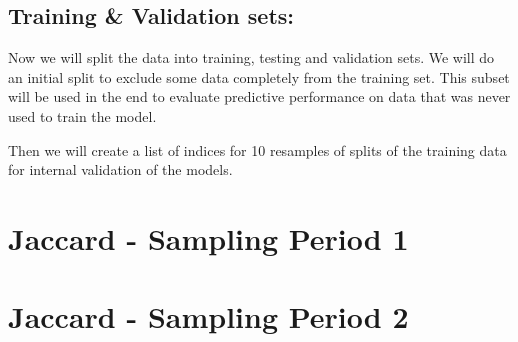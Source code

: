 \documentclass[
  letterpaper,
  DIV=11,
  numbers=noendperiod]{scrreprt}
\newenvironment{Shaded}{\begin{snugshade}}{\end{snugshade}}
\newcommand{\AttributeTok}[1]{\textcolor[rgb]{0.40,0.45,0.13}{#1}}
\newcommand{\CommentTok}[1]{\textcolor[rgb]{0.37,0.37,0.37}{#1}}
\newcommand{\ConstantTok}[1]{\textcolor[rgb]{0.56,0.35,0.01}{#1}}
\newcommand{\DecValTok}[1]{\textcolor[rgb]{0.68,0.00,0.00}{#1}}
\newcommand{\FloatTok}[1]{\textcolor[rgb]{0.68,0.00,0.00}{#1}}
\newcommand{\FunctionTok}[1]{\textcolor[rgb]{0.28,0.35,0.67}{#1}}
\newcommand{\NormalTok}[1]{\textcolor[rgb]{0.00,0.23,0.31}{#1}}
\newcommand{\OtherTok}[1]{\textcolor[rgb]{0.00,0.23,0.31}{#1}}
\newcommand{\SpecialCharTok}[1]{\textcolor[rgb]{0.37,0.37,0.37}{#1}}
\begin{document}
\subsection{Training \& Validation
sets:}\label{training-validation-sets}

Now we will split the data into training, testing and validation sets.
We will do an initial split to exclude some data completely from the
training set. This subset will be used in the end to evaluate predictive
performance on data that was never used to train the model.

Then we will create a list of indices for 10 resamples of splits of the
training data for internal validation of the models.

\section{Jaccard - Sampling Period 1}

\begin{Shaded}
\end{Shaded}

\section{Jaccard - Sampling Period 2}
\end{document}
